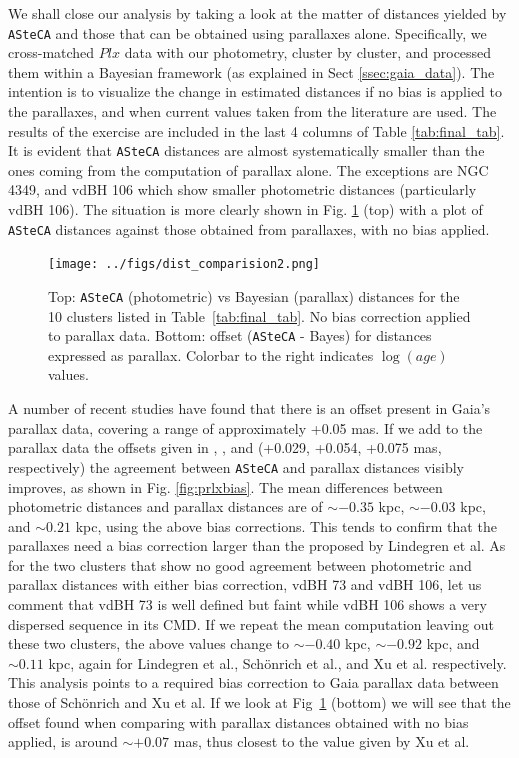 \documentclass[draft]{aa}
\begin{document}
We shall close our analysis by taking a look at the matter of distances yielded
by \texttt{ASteCA} and those that can be obtained using parallaxes alone.
Specifically, we cross-matched $Plx$ data with our photometry, cluster by
cluster, and processed them within a Bayesian framework (as explained in Sect
\ref{ssec:gaia_data}). The intention is to visualize the change in estimated
distances if no bias is applied to the parallaxes, and when current values
taken from the literature are used. The results of the exercise are included in
the last 4 columns of Table  \ref{tab:final_tab}. It is evident that 
\texttt{ASteCA} distances are almost systematically smaller than the ones
coming from the computation of parallax alone. The exceptions are NGC 4349, and
vdBH 106 which show smaller photometric distances (particularly vdBH 106). The
situation is more clearly shown in Fig. \ref{fig:prlxnobias}  (top) with a plot
of \texttt{ASteCA} distances against those obtained from parallaxes, with no
bias applied.\\

\begin{figure}[ht]
    \centering
    \texttt{[image: ../figs/dist\_comparision2.png]}
    \caption{Top: \texttt{ASteCA} (photometric) vs Bayesian (parallax)
    distances for the 10 clusters listed in Table~\ref{tab:final_tab}. No bias
    correction applied to parallax data.
    Bottom: offset (\texttt{ASteCA} - Bayes) for distances expressed
    as parallax. Colorbar to the right indicates $\log(age)$ values.}
    \label{fig:prlxnobias}
\end{figure}

A number of recent studies have found that there is an offset present in Gaia's
parallax data, covering a range of approximately +0.05 mas.
If we add to the parallax data the offsets given in \cite{Lindegren_2018}, 
\cite{Schonrich2019}, and \cite{Xu_2019} (+0.029, +0.054, +0.075 mas,
respectively) the agreement between \texttt{ASteCA} and parallax distances
visibly improves, as shown in Fig. \ref{fig:prlxbias}.
%
The mean differences between photometric distances and parallax distances are
of $\sim-0.35$ kpc, $\sim-0.03$ kpc, and $\sim0.21$ kpc, using the above bias
corrections. This tends to confirm that the parallaxes need a bias correction
larger than the proposed by Lindegren et al.
%
As for the two clusters that show no good agreement between photometric and
parallax distances with either bias correction, vdBH 73 and vdBH 106, let us
comment that vdBH 73 is well defined but faint while vdBH 106 shows
a very dispersed sequence in its CMD.
%
If we repeat the mean computation leaving out these two clusters, the above
values change to $\sim-0.40$ kpc, $\sim-0.92$ kpc, and $\sim0.11$ kpc, again
for Lindegren et al., Sch\"onrich et al., and Xu et al. respectively. This
analysis points to a required bias correction to Gaia parallax data between
those of Sch\"onrich and Xu et al. If we look at Fig~\ref{fig:prlxnobias} 
(bottom) we will see that the offset found when comparing with parallax
distances obtained with no bias applied, is around $\sim+0.07$ mas, thus
closest to the value given by Xu et al.
\end{document}
